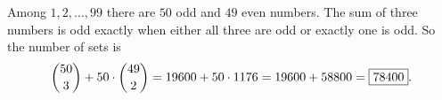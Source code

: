 Among $1,2,\dots,99$ there are $50$ odd and $49$ even numbers. The sum of three numbers is odd exactly when either all three are odd or exactly one is odd. So the number of sets is
\[\dbinom{50}{3}+50\cdot\dbinom{49}{2}=19600+50\cdot1176=19600+58800=\boxed{78400}.\]
